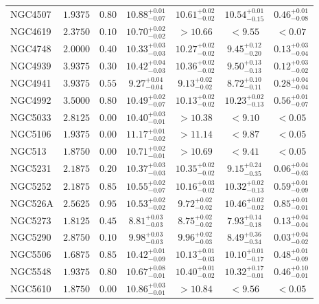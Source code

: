 \documentclass[onecolumn]{mn2e}
\begin{document}
{\begin{center}
\begin{longtable}{lcccccc}
NGC4507 & $1.9375$ & $0.80$ & $10.88_{-0.07}^{+0.01}$ & $10.61_{-0.02}^{+0.02}$ & $10.54_{-0.15}^{+0.01}$ &$0.46_{-0.08}^{+0.01}$ \\
NGC4619 & $2.3750$ & $0.10$ & $10.70_{-0.02}^{+0.02}$ & $>10.66$ & $<9.55$ &$<0.07$ \\
NGC4748 & $2.0000$ & $0.40$ & $10.33_{-0.03}^{+0.03}$ & $10.27_{-0.02}^{+0.02}$ & $9.45_{-0.20}^{+0.12}$ &$0.13_{-0.04}^{+0.03}$ \\
NGC4939 & $3.9375$ & $0.30$ & $10.42_{-0.03}^{+0.04}$ & $10.36_{-0.02}^{+0.02}$ & $9.50_{-0.13}^{+0.13}$ &$0.12_{-0.02}^{+0.03}$ \\
NGC4941 & $3.9375$ & $0.55$ & $9.27_{-0.04}^{+0.04}$ & $9.13_{-0.02}^{+0.02}$ & $8.72_{-0.11}^{+0.10}$ &$0.28_{-0.04}^{+0.04}$ \\
NGC4992 & $3.5000$ & $0.80$ & $10.49_{-0.07}^{+0.02}$ & $10.13_{-0.02}^{+0.02}$ & $10.23_{-0.13}^{+0.02}$ &$0.56_{-0.07}^{+0.01}$ \\
NGC5033 & $2.8125$ & $0.00$ & $10.40_{-0.01}^{+0.03}$ & $>10.38$ & $<9.10$ &$<0.05$ \\
NGC5106 & $1.9375$ & $0.00$ & $11.17_{-0.02}^{+0.01}$ & $>11.14$ & $<9.87$ &$<0.05$ \\
NGC513 & $1.8750$ & $0.00$ & $10.71_{-0.01}^{+0.02}$ & $>10.69$ & $<9.41$ &$<0.05$ \\
NGC5231 & $2.1875$ & $0.20$ & $10.37_{-0.03}^{+0.03}$ & $10.35_{-0.02}^{+0.02}$ & $9.15_{-0.35}^{+0.24}$ &$0.06_{-0.03}^{+0.04}$ \\
NGC5252 & $2.1875$ & $0.85$ & $10.55_{-0.07}^{+0.02}$ & $10.16_{-0.02}^{+0.03}$ & $10.32_{-0.13}^{+0.02}$ &$0.59_{-0.09}^{+0.01}$ \\
NGC526A & $2.5625$ & $0.95$ & $10.53_{-0.02}^{+0.02}$ & $9.72_{-0.02}^{+0.02}$ & $10.46_{-0.02}^{+0.02}$ &$0.85_{-0.01}^{+0.01}$ \\
NGC5273 & $1.8125$ & $0.45$ & $8.81_{-0.03}^{+0.03}$ & $8.75_{-0.02}^{+0.02}$ & $7.93_{-0.18}^{+0.14}$ &$0.13_{-0.04}^{+0.04}$ \\
NGC5290 & $2.8750$ & $0.10$ & $9.98_{-0.03}^{+0.03}$ & $9.96_{-0.03}^{+0.02}$ & $8.49_{-0.34}^{+0.36}$ &$0.03_{-0.02}^{+0.04}$ \\
NGC5506 & $1.6875$ & $0.85$ & $10.42_{-0.09}^{+0.01}$ & $10.13_{-0.03}^{+0.01}$ & $10.10_{-0.17}^{+0.01}$ &$0.48_{-0.09}^{+0.01}$ \\
NGC5548 & $1.9375$ & $0.80$ & $10.67_{-0.01}^{+0.08}$ & $10.40_{-0.02}^{+0.01}$ & $10.32_{-0.01}^{+0.17}$ &$0.46_{-0.01}^{+0.10}$ \\
NGC5610 & $1.8750$ & $0.00$ & $10.86_{-0.01}^{+0.03}$ & $>10.84$ & $<9.56$ &$<0.05$ \\

\end{longtable}
\end{center}}
\end{document}
